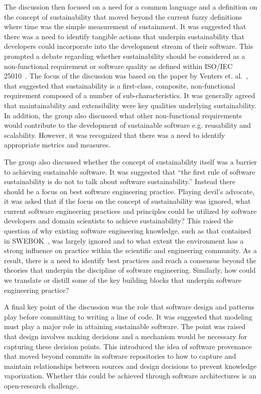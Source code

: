 \documentclass[11pt, oneside]{amsart}
\begin{document}
The discussion then focused on a need for a common language and a definition on
the concept of sustainability that moved beyond the current fuzzy definitions
where time was the simple measurement of sustainment. It was suggested that
there was a need to identify tangible actions that underpin sustainability that
developers could incorporate into the development stream of their software. This
prompted a debate regarding whether sustainability should be considered as a
non-functional requirement or software quality as defined within ISO/IEC
25010~\cite{iso25010}. The focus of the discussion was based on the paper by
Venters et. al.~\cite{wssspe2_venters}, that suggested that sustainability is a
first-class, composite, non-functional requirement composed of a number of
sub-characteristics. It was generally agreed that maintainability and
extensibility were key qualities underlying sustainability. In addition, the
group also discussed what other non-functional requirements would contribute to
the development of sustainable software e.g. reusability and scalability.
However, it was recognized that there was a need to identify appropriate metrics
and measures.

The group also discussed whether the concept of sustainability itself was a
barrier to achieving sustainable software. It was suggested that ``the first
rule of software sustainability is do not to talk about software
sustainability.'' Instead there should be a focus on best software engineering
practice. Playing devil's advocate, it was asked that if the focus on the
concept of sustainability was ignored, what current software engineering
practices and principles could be utilized by software developers and domain
scientists to achieve sustainability? This raised the question of why existing
software engineering knowledge, such as that contained in
SWEBOK~\cite{Bourque2014}, was largely ignored and to what extent the
environment has a strong influence on practice within the scientific and
engineering community. As a result, there is a need to identify best practices
and reach a consensus beyond the theories that underpin the discipline of
software engineering. Similarly, how could we translate or distill some of the
key building blocks that underpin software engineering practice?

A final key point of the discussion was the role that software design and
patterns play before committing to writing a line of code. It was suggested that
modeling must play a major role in attaining sustainable software. The point was
raised that design involves making decisions and a mechanism would be necessary
for capturing these decision points. This introduced the idea of software
provenance that moved beyond commits in software repositories to how to capture
and maintain relationships between sources and design decisions to prevent
knowledge vaporization. Whether this could be achieved through software
architectures is an open-research challenge.
\end{document}
